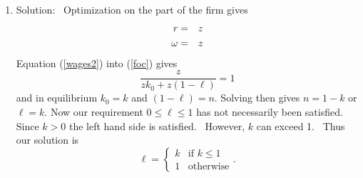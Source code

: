 \documentclass{article}
\begin{document}
\begin{enumerate}
\begin{enumerate}
so 
\begin{eqnarray*}
\ell &=&\gamma \\
k &=&k_{0} \\
c &=&y=zk^{\gamma }n^{1-\gamma } \\
\omega &=&z\left( 1-\gamma \right) \left( \frac{k}{n}\right) ^{\gamma } \\
r &=&z\gamma \left( \frac{n}{k}\right) ^{1-\gamma }
\end{eqnarray*}%
There are a couple of things to notice. First, we have solved for every item
that the definition calls for. Second, in listing $\ell $ through $r$ we
have done it in such a way that the expressions include no terms that have
not previously been defined in terms of the model's parameters. Third, we
have one constraint that we have not yet dealt with, $0\leq \ell \leq 1.$
However since $0<\gamma <1$ this is satisfied. \ Finally, we are sloppy here
in that we ignore second or conditions. (Are these solutions maximums or
minimums?) You can always ignore second order conditions when not explicitly
asked for. However, be aware that they are required to actually be rigorous.

\item Solution: \ Optimization on the part of the firm gives 
\begin{eqnarray}
r &=&z  \label{wages2} \\
\omega &=&z  \notag
\end{eqnarray}%
Equation (\ref{wages2}) into (\ref{foc}) gives 
\begin{equation*}
\frac{z}{zk_{0}+z\left( 1-\ell \right) }=1
\end{equation*}%
and in equilibrium $k_{0}=k$ and $\left( 1-\ell \right) =n$. Solving then
gives $n=1-k$ or $\ell =k$. Now our requirement $0\leq \ell \leq 1$ has not
necessarily been satisfied. Since $k>0$ the left hand side is satisfied. \
However, $k$ can exceed 1. \ Thus our solution is 
\begin{equation*}
\ell =\left\{ 
\begin{array}{cc}
k & \text{if }k\leq 1 \\ 
1 & \text{otherwise}%
\end{array}%
\right. .
\end{equation*}
\end{enumerate}
\end{enumerate}
\end{document}
